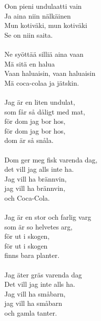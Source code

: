 
Oon pieni undulaatti vain \\ Ja aina niin nälkäinen \\ Mun kotiväki, mun kotiväki \\ Se on niin saita. \\ \hspace{10mm} \\ Ne syöttää silliä aina vaan \\ Mä sitä en halua \\ Vaan haluaisin, vaan haluaisin \\ Mä coca-colaa ja jätskin. \\ \hspace{10mm} \\ Jag är en liten undulat, \\ som får så dåligt med mat, \\ för dom jag bor hos, \\ för dom jag bor hos, \\ dom är så snåla. \\ \hspace{10mm} \\ Dom ger meg fisk varenda dag, \\ det vill jag alls inte ha. \\ Jag vill ha brännvin, \\ jag vill ha brännvin, \\ och Coca-Cola. \\ \hspace{10mm} \\ Jag är en stor och farlig varg \\ som är so helvetes arg, \\ för ut i skogen, \\ för ut i skogen \\ finns bara planter. \\ \hspace{10mm} \\ Jag äter gräs varenda dag \\ Det vill jag inte alls ha. \\ Jag vill ha småbarn, \\ jag vill ha småbarn \\ och gamla tanter.